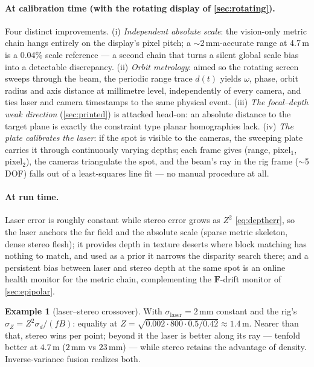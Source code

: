 \documentclass[11pt]{article}
\theoremstyle{definition}
\newtheorem{example}{Example}
\newcommand{\mat}[1]{\mathbf{#1}}
\newcommand{\F}{\mat{F}}
\begin{document}
\paragraph{At calibration time (with the rotating display of
\autoref{sec:rotating}).} Four distinct improvements. (i) \emph{Independent
absolute scale}: the vision-only metric chain hangs entirely on the
display's pixel pitch; a $\sim$2\,mm-accurate range at 4.7\,m is a 0.04\%
scale reference --- a second chain that turns a silent global scale bias
into a detectable discrepancy. (ii) \emph{Orbit metrology}: aimed so the
rotating screen sweeps through the beam, the periodic range trace $d(t)$
yields $\omega$, phase, orbit radius and axis distance at millimetre level,
independently of every camera, and ties laser and camera timestamps to the
same physical event. (iii) \emph{The focal--depth weak direction}
(\autoref{sec:printed}) is attacked head-on: an absolute distance to the
target plane is exactly the constraint type planar homographies lack.
(iv) \emph{The plate calibrates the laser}: if the spot is visible to the
cameras, the sweeping plate carries it through continuously varying depths;
each frame gives (range, pixel$_1$, pixel$_2$), the cameras triangulate the
spot, and the beam's ray in the rig frame ($\sim$5 DOF) falls out of a
least-squares line fit --- no manual procedure at all.

\paragraph{At run time.} Laser error is roughly constant while stereo error
grows as $Z^2$ \eqref{eq:deptherr}, so the laser anchors the far field and
the absolute scale (sparse metric skeleton, dense stereo flesh); it
provides depth in texture deserts where block matching has nothing to
match, and used as a prior it narrows the disparity search there; and a
persistent bias between laser and stereo depth at the same spot is an
online health monitor for the metric chain, complementing the $\F$-drift
monitor of \autoref{sec:epipolar}.

\begin{example}[laser--stereo crossover]
\label{ex:crossover}
With $\sigma_{\text{laser}}=2$\,mm constant and the rig's
$\sigma_Z=Z^2\sigma_d/(fB)$: equality at
$Z=\sqrt{0.002\cdot 800\cdot 0.5/0.42}\approx1.4$\,m. Nearer than that,
stereo wins per point; beyond it the laser is better along its ray ---
tenfold better at $4.7$\,m ($2$\,mm vs $23$\,mm) --- while stereo retains
the advantage of density. Inverse-variance fusion realizes both.
\end{example}
\end{document}
